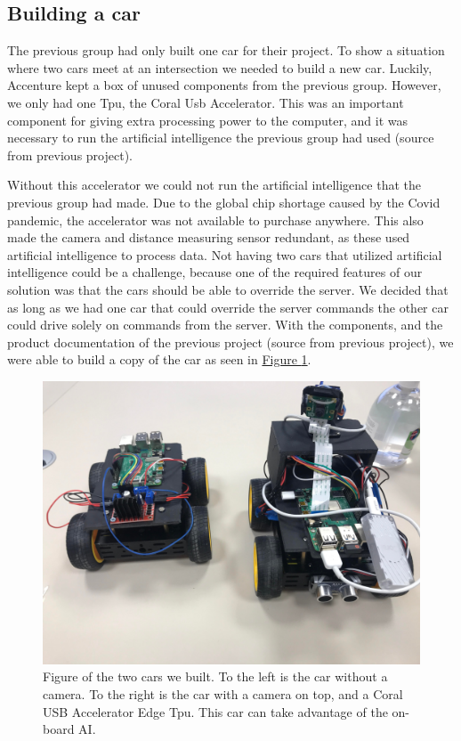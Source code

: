 \subsection{Building a car}
The previous group had only built one car for their project. To show a situation where two cars meet at an intersection we needed to build a new car. Luckily, Accenture kept a box of unused components from the previous group. However, we only had one Tpu, the Coral Usb Accelerator. This was an important component for giving extra processing power to the computer, and it was necessary to run the artificial intelligence the previous group had used (source from previous project). 

Without this accelerator we could not run the artificial intelligence that the previous group had made. Due to the global chip shortage caused by the Covid pandemic, the accelerator was not available to purchase anywhere. This also made the camera and distance measuring sensor redundant, as these used artificial intelligence to process data. Not having two cars that utilized artificial intelligence could be a challenge, because one of the required features of our solution was that the cars should be able to override the server. We decided that as long as we had one car that could override the server commands the other car could drive solely on commands from the server. With the components, and the product documentation of the previous project (source from previous project), we were able to build a copy of the car as seen in \hyperref[fig:twocars]{Figure \ref{fig:twocars}}.

\begin{figure}[h!]
	\centering
	\includegraphics[width=0.9\linewidth]{figures/two_cars}
	\caption[scrum process]{Figure of the two cars we built. To the left is the car without a camera. To the right is the car with a camera on top, and a Coral USB Accelerator Edge Tpu. This car can take advantage of the on-board AI.}
	\label{fig:twocars}
\end{figure}



